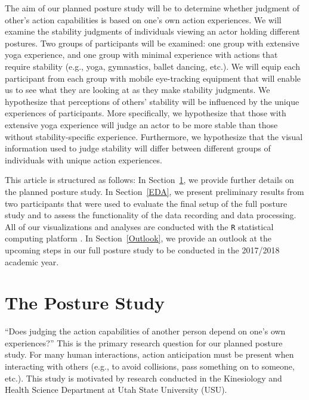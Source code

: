 \documentclass[11pt]{asaproc}
\begin{document}
The aim of our planned posture study will be to determine whether judgment of other's action capabilities is based on one's own action experiences. We will examine the stability judgments of individuals viewing an actor holding different postures. Two groups of participants will be examined: one group with extensive yoga experience, and one group with minimal experience with actions that require stability (e.g., yoga, gymnastics, ballet dancing, etc.).  We will equip each participant from each group with mobile eye-tracking equipment that will enable us to see what they are looking at as they make stability judgments. We hypothesize that perceptions of others' stability will be influenced by the unique experiences of participants. More specifically, we hypothesize that those with extensive yoga experience will judge an actor to be more stable than those without stability-specific experience.  Furthermore, we hypothesize that the visual information used to judge stability will differ between different groups of individuals with unique action experiences.

This article is structured as follows: In Section~\ref{PostureStudy}, we provide further details on the planned posture study.
In Section~\ref{EDA}, we present preliminary results from two participants that were used to evaluate the final setup
of the full posture study and to assess the functionality of the data recording and data processing.
All of our visualizations and analyses are conducted with the {\tt R} statistical computing platform \citep{RCore2017}.
In Section~\ref{Outlook}, we provide an outlook at the upcoming steps in our full posture study to be conducted in the 2017/2018
academic year.


\section{The Posture Study}  
\label{PostureStudy}

``Does judging the action capabilities of another person depend on one's own experiences?'' This is the
primary research question for our planned posture study. For many human interactions, 
action anticipation must be present when interacting with others (e.g., 
to avoid collisions, pass something on to someone, etc.). This study is 
motivated by research conducted in the Kinesiology and Health Science Department at Utah State University (USU).
\end{document}

